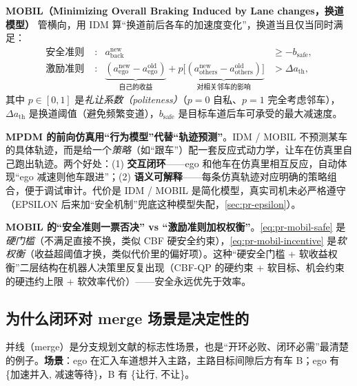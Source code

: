 \textbf{MOBIL（Minimizing Overall Braking Induced by Lane changes，换道模型）}\cite{kesting2007mobil} 管横向，用 IDM 算“换道前后各车的加速度变化”，换道当且仅当同时满足：
\begin{align}
  \text{安全准则}\;&: & a^{\mathrm{new}}_{\mathrm{back}}&\ge -b_{\mathrm{safe}}, \label{eq:pr-mobil-safe}\\
  \text{激励准则}\;&: & \underbrace{(a^{\mathrm{new}}_{\mathrm{ego}}-a^{\mathrm{old}}_{\mathrm{ego}})}_{\text{自己的收益}}+p\underbrace{\big[(a^{\mathrm{new}}_{\mathrm{others}}-a^{\mathrm{old}}_{\mathrm{others}})\big]}_{\text{对相关邻车的影响}}&>\Delta a_{\mathrm{th}}, \label{eq:pr-mobil-incentive}
\end{align}
其中 $p\in[0,1]$ 是\emph{礼让系数（politeness）}（$p=0$ 自私、$p=1$ 完全考虑邻车），$\Delta a_{\mathrm{th}}$ 是换道阈值（避免频繁变道），$b_{\mathrm{safe}}$ 是目标车道后车可承受的最大减速度。

\begin{insight}
\textbf{MPDM 的前向仿真用“行为模型”代替“轨迹预测”}。IDM / MOBIL 不预测某车的具体轨迹，而是给一个\emph{策略}（如“跟车”）配一套反应式动力学，让车在仿真里自己跑出轨迹。两个好处：(1) \textbf{交互闭环}——ego 和他车在仿真里相互反应，自动体现“ego 减速则他车跟进”；(2) \textbf{语义可解释}——每条仿真轨迹对应明确的策略组合，便于调试审计。代价是 IDM / MOBIL 是简化模型，真实司机未必严格遵守（EPSILON 后来加“安全机制”兜底这种模型失配，\cref{sec:pr-epsilon}）。
\end{insight}

\begin{insight}
\textbf{MOBIL 的“安全准则一票否决” vs “激励准则加权权衡”}。\cref{eq:pr-mobil-safe} 是\emph{硬门槛}（不满足直接不换，类似 CBF 硬安全约束），\cref{eq:pr-mobil-incentive} 是\emph{软权衡}（收益超阈值才换，类似代价里的偏好项）。这种“硬安全门槛 + 软收益权衡”二层结构在机器人决策里反复出现（CBF-QP 的硬约束 + 软目标、机会约束的硬违约上限 + 软效率代价）——安全永远优先于效率。
\end{insight}

\subsection{为什么闭环对 merge 场景是决定性的}
\label{sec:pr-mpdm-merge}

并线（merge）是分支规划文献的标志性场景，也是“开环必败、闭环必需”最清楚的例子\cite{cunningham2015mpdm}。\textbf{场景}：ego 在汇入车道想并入主路，主路目标间隙后方有车 B；ego 有 \{加速并入, 减速等待\}，B 有 \{让行, 不让\}。

